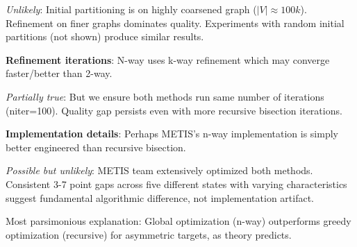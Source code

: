 \textit{Unlikely}: Initial partitioning is on highly coarsened graph ($|V| \approx 100k$). Refinement on finer graphs dominates quality. Experiments with random initial partitions (not shown) produce similar results.

\textbf{Refinement iterations}: N-way uses k-way refinement which may converge faster/better than 2-way.

\textit{Partially true}: But we ensure both methods run same number of iterations (niter=100). Quality gap persists even with more recursive bisection iterations.

\textbf{Implementation details}: Perhaps METIS's n-way implementation is simply better engineered than recursive bisection.

\textit{Possible but unlikely}: METIS team extensively optimized both methods. Consistent 3-7 point gaps across five different states with varying characteristics suggest fundamental algorithmic difference, not implementation artifact.

Most parsimonious explanation: Global optimization (n-way) outperforms greedy optimization (recursive) for asymmetric targets, as theory predicts.
